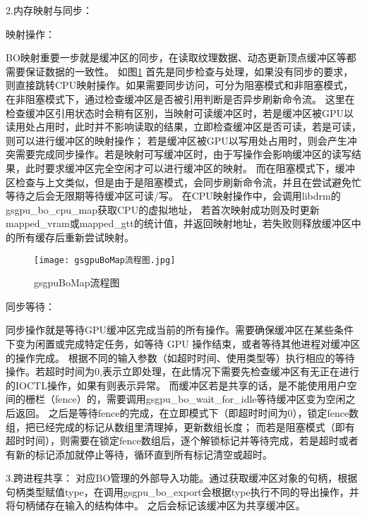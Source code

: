 2.内存映射与同步：

映射操作：

BO映射重要一步就是缓冲区的同步，在读取纹理数据、动态更新顶点缓冲区等都需要保证数据的一致性。
如图\ref{fig:gsgpuBoMap流程图}
首先是同步检查与处理，如果没有同步的要求，则直接跳转CPU映射操作。如果需要同步访问，可分为阻塞模式和非阻塞模式，在非阻塞模式下，通过检查缓冲区是否被引用判断是否异步刷新命令流。
这里在检查缓冲区引用状态时会稍有区别，当映射可读缓冲区时，若是缓冲区被GPU以读用处占用时，此时并不影响读取的结果，立即检查缓冲区是否可读，若是可读，则可以进行缓冲区的映射操作；
若是缓冲区被GPU以写用处占用时，则会产生冲突需要完成同步操作。若是映射可写缓冲区时，由于写操作会影响缓冲区的读写结果，此时要求缓冲区完全空闲才可以进行缓冲区的映射。
而在阻塞模式下，缓冲区检查与上文类似，但是由于是阻塞模式，会同步刷新命令流，并且在尝试避免忙等待之后会无限期等待缓冲区可读/写。
在CPU映射操作中，会调用libdrm的gsgpu\_bo\_cpu\_map获取CPU的虚拟地址，
若首次映射成功则及时更新mapped\_vram或mapped\_gtt的统计值，并返回映射地址，若失败则释放缓冲区中的所有缓存后重新尝试映射。

\begin{figure}[h]
  \centering
  \texttt{[image: gsgpuBoMap流程图.jpg]}
  \caption{gsgpuBoMap流程图}
  \label{fig:gsgpuBoMap流程图}
\end{figure}

同步等待：

同步操作就是等待GPU缓冲区完成当前的所有操作。需要确保缓冲区在某些条件下变为闲置或完成特定任务，如等待 GPU 操作结束，或者等待其他进程对缓冲区的操作完成。
根据不同的输入参数（如超时时间、使用类型等）执行相应的等待操作。若超时时间为0,表示立即处理，在此情况下需要先检查缓冲区有无正在进行的IOCTL操作，如果有则表示异常。
而缓冲区若是共享的话，是不能使用用户空间的栅栏（fence）的，需要调用gsgpu\_bo\_wait\_for\_idle等待缓冲区变为空闲之后返回。
之后是等待fence的完成，在立即模式下（即超时时间为0），锁定fence数组，把已经完成的标记从数组里清理掉，更新数组长度；
而若是阻塞模式（即有超时时间），则需要在锁定fence数组后，逐个解锁标记并等待完成，若是超时或者有新的标记添加就停止等待，循环直到所有标记清空或超时。

3.跨进程共享：
对应BO管理的外部导入功能。通过获取缓冲区对象的句柄，根据句柄类型赋值type，在调用gsgpu\_bo\_export会根据type执行不同的导出操作，并将句柄储存在输入的结构体中。
之后会标记该缓冲区为共享缓冲区。




